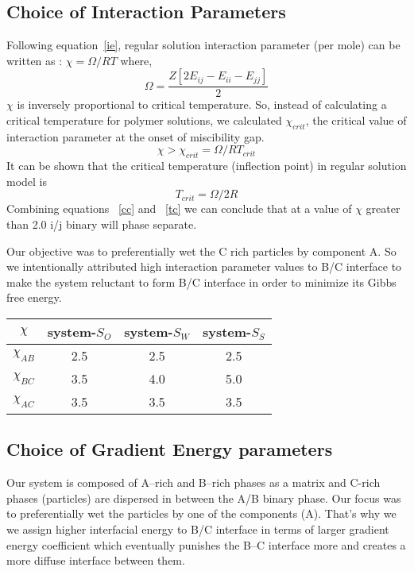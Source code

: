 \documentclass[12pt]{iiscthes}
\theoremstyle{definition}
\theoremstyle{definition}
\theoremstyle{remark}
\begin{document}
\subsection{Choice of Interaction Parameters}
Following equation~\ref{ie}, regular solution interaction parameter (per mole) can be written as : $\chi = \Omega/RT$ where,
\begin{equation}\Omega = \dfrac{Z\left[2E_{ij}-E_{ii}-E_{jj}\right]}{2} \end{equation}
$\chi$ is inversely proportional to critical temperature. So, instead of calculating a critical temperature for polymer solutions, we calculated $\chi_{crit}$, the critical value of interaction parameter at the onset of miscibility gap. 
\begin{equation}\label{cc}\chi > \chi_{crit}  = \Omega/RT_{crit}\end{equation}
It can be shown that the critical temperature (inflection point) in regular solution model is \begin{equation}\label{tc}
T_{crit} = \Omega / 2R
\end{equation}
Combining equations ~\ref{cc} and ~\ref{tc} we can conclude that at a value of $\chi$ greater than
2.0 i/j binary will phase separate.

Our objective was to preferentially wet the C rich particles by component A. So we intentionally attributed high interaction parameter values to B/C interface to make the system reluctant to form B/C interface in order to minimize its Gibbs free energy.
\begin{table}[h]
\begin{center}
\begin{tabular}{|c|c|c|c|}
\hline
$\chi$ & system-$S_O$ & system-$S_W$ & system-$S_S$\\
\hline
$\chi_{AB}$ & 2.5 & 2.5 & 2.5 \\
\hline\hline
$\chi_{BC}$ & 3.5 & 4.0 & 5.0 \\
\hline \hline
$\chi_{AC}$ & 3.5 & 3.5 & 3.5 \\
\hline
\end{tabular}
\end{center}
\end{table}
\subsection{Choice of Gradient Energy parameters} Our system is composed of A--rich and B--rich phases as a matrix  and C-rich phases (particles) are dispersed in between the A/B binary phase. Our focus was to preferentially wet the particles by one of the components (A). That's why we we assign higher interfacial energy to B/C interface in terms of larger gradient energy coefficient which eventually punishes the B--C interface more and creates a more diffuse interface between them.
\end{document}
